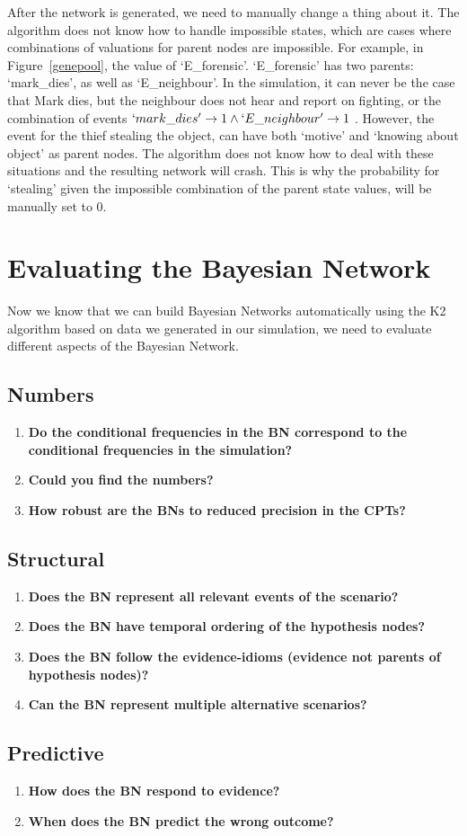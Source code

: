 After the network is generated, we need to manually change a thing about it. The algorithm does not know how to handle impossible states, which are cases where combinations of valuations for parent nodes are impossible. For example, in Figure~\ref{genepool}, the value of `E\_forensic'. `E\_forensic' has two parents: `mark\_dies', as well as `E\_neighbour'. In the simulation, it can never be the case that Mark dies, but the neighbour does not hear and report on fighting, or the combination of events $`mark\_dies' \rightarrow 1 \land `E\_neighbour' \rightarrow 1$ .  However, the event for the thief stealing the object, can have both `motive' and `knowing about object' as parent nodes. The algorithm does not know how to deal with these situations and the resulting network will crash. This is why the probability for `stealing' given the impossible combination of the parent state values, will be manually set to 0. 


\section{Evaluating the Bayesian Network}

Now we know that we can build Bayesian Networks automatically using the K2 algorithm based on data we generated in our simulation, we need to evaluate different aspects of the Bayesian Network.


\subsection{Numbers}
\begin{enumerate}
\item \textbf{Do the conditional frequencies in the BN correspond to the conditional frequencies in the simulation?}
\item \textbf{Could you find the numbers?}
\item \textbf{How robust are the BNs to reduced precision in the CPTs?}
\end{enumerate}

\subsection{Structural}

\begin{enumerate}
\item \textbf{Does the BN represent all relevant events of the scenario?}
\item \textbf{Does the BN have temporal ordering of the hypothesis nodes?}
\item \textbf{Does the BN follow the evidence-idioms (evidence not parents of hypothesis nodes)?}
\item \textbf{Can the BN represent multiple alternative scenarios?}

\end{enumerate}

\subsection{Predictive}
\begin{enumerate}
\item \textbf{How does the BN respond to evidence?}
\item \textbf{When does the BN predict the wrong outcome?}
\end{enumerate}
